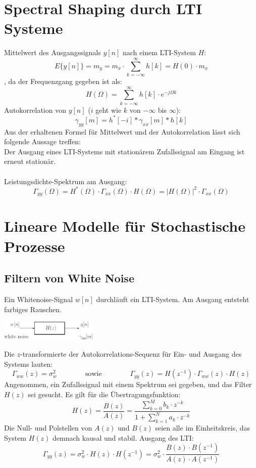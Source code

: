 \section{Spectral Shaping durch LTI Systeme}
Mittelwert des Ausgangssignals $y[n]$ nach einem LTI-System $H$:
\[ E\{y[n]\} = m_y = m_x \cdot \sum_{k=-\infty}^{\infty} h[k] = H(0) \cdot m_x \]
, da der Frequenzgang gegeben ist als: 
\[ H(\Omega) = \sum_{k=-\infty}^{\infty}h[k]\cdot e^{-j \Omega k} \]
Autokorrelation von $y[n]$ ($i$ geht wie $k$ von $-\infty$ bis $\infty$):
\[ \gamma_{yy}[m] = h^*[-i]*\gamma_{xx}[m]*h[k] \]
Aus der erhaltenen Formel für Mittelwert und der Autokorrelation lässt sich folgende Aussage treffen:\\
\hspace{10mm} \textrightarrow Der Ausgang eines LTI-Systems mit stationärem Zufallssignal am Eingang ist erneut stationär.\\\\
Leistungsdichte-Spektrum am Ausgang:
\[ \Gamma_{yy}(\Omega) = H^*(\Omega)\cdot\Gamma_{xx}(\Omega)\cdot H(\Omega) 
	= |H(\Omega)|^2 \cdot \Gamma_{xx}(\Omega) \]

	 
\section{Lineare Modelle für Stochastische Prozesse}
\subsection{Filtern von White Noise}
Ein Whitenoise-Signal $w[n]$ durchläuft ein LTI-System. Am Ausgang entsteht 
farbiges Rauschen. 
\begin{center}
	\includegraphics[width=0.35\textwidth]{../fig/filtering_of_white_noise}
\end{center}
Die $z$-transformierte der Autokorrelations-Sequenz für Ein- und Ausgang des Systems lauten:
\[ \Gamma_{ww}(z) = \sigma_w^2 \qquad \qquad \text{sowie} \qquad \qquad 
	 \Gamma_{yy}(z) = H(z^{-1})\cdot \Gamma_{ww}(z) \cdot H(z) \]
Angenommen, ein Zufallssignal mit einem Spektrum sei gegeben, und das Filter $H(z)$
sei gesucht. Es gilt für die Übertragungsfunktion:
\[ H(z) = \frac{B(z)}{A(z)} = \frac{\sum_{k=0}^{M} b_{k} \cdot z^{-k}}
								{1+ \sum_{k=1}^{N} a_{k} \cdot z^{-k}} \]
Die Null- und Polstellen von $A(z)$ und $B(z)$ seien alle
im Einheitskreis, das System $H(z)$ demnach kausal und stabil.
Ausgang des LTI:
\[ \Gamma_{yy}(z) = \sigma_w^2 \cdot H(z) \cdot H(z^{-1}) =
  \sigma_w^2 \cdot \frac{B(z) \cdot B(z^{-1})}{A(z) \cdot A(z^{-1})} \]

